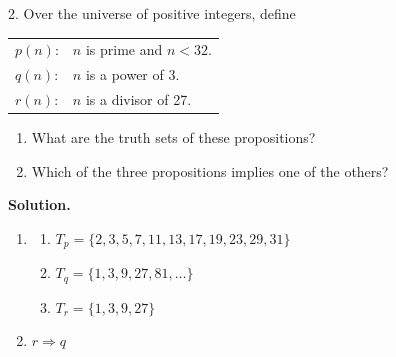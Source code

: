 \documentclass[10pt,]{book}
\theoremstyle{plain}
\theoremstyle{definition}
\theoremstyle{definition}
\theoremstyle{definition}
\theoremstyle{definition}
\begin{document}
\begin{exercisegroup}
\leavevmode%
%
\item[2.]\hypertarget{exercise-32}{}Over the universe of positive integers, define%
\leavevmode%
\begin{table}
\centering
\begin{tabular}{ll}
\(p(n)\):& \(n\) is prime and \(n < 32\).\tabularnewline[0pt]
\(q(n)\):& \(n\) is a power of 3.\tabularnewline[0pt]
\(r(n)\):& \(n\) is a divisor of 27.
\end{tabular}
\end{table}
\par
\leavevmode%
\begin{enumerate}[label=\alph*]
\item\hypertarget{li-250}{}  What are the truth sets of these propositions?%
\item\hypertarget{li-251}{}  Which of the three propositions implies one of the others?%
\end{enumerate}
%
\par\smallskip
\par\smallskip
\noindent\textbf{Solution.}\hypertarget{solution-3}{}\quad
\leavevmode%
\begin{enumerate}[label=\alph*]
\item\hypertarget{li-252}{}%
\begin{enumerate}[label=\roman*]
\item\hypertarget{li-253}{} \(T_p = \{2, 3, 5, 7, 11, 13, 17, 19, 23, 29, 31 \}\)%
\item\hypertarget{li-254}{} \(T_q = \{1, 3, 9, 27, 81, \dots \}\)%
\item\hypertarget{li-255}{} \(T_r = \{1, 3, 9, 27 \}\)%
\end{enumerate}
%
\item\hypertarget{li-256}{} \( r \Rightarrow q \) %
\end{enumerate}

\end{exercisegroup}
\end{document}
